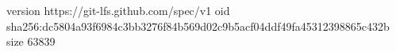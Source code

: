 version https://git-lfs.github.com/spec/v1
oid sha256:dc5804a93f6984c3bb3276f84b569d02c9b5acf04ddf49fa45312398865c432b
size 63839
